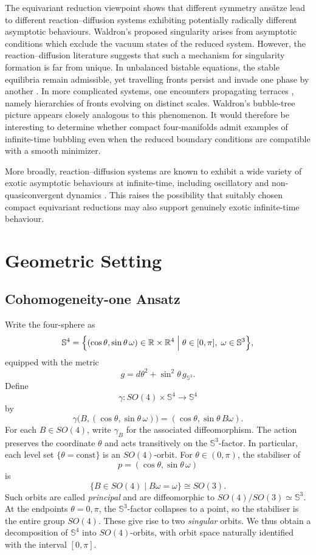 \documentclass[11pt,a4paper]{article}
\numberwithin{equation}{section}
\theoremstyle{plain}
\theoremstyle{remark}
\begin{document}
The equivariant reduction viewpoint shows that different symmetry ans\"{a}tze lead to different reaction–diffusion systems exhibiting potentially radically different asymptotic behaviours. Waldron’s proposed singularity arises from asymptotic conditions which exclude the vacuum states of the reduced system. However, the reaction–diffusion literature suggests that such a mechanism for singularity formation is far from unique. In unbalanced bistable equations, the stable equilibria remain admissible, yet travelling fronts persist and invade one phase by another \cite{Fukao2004}. In more complicated systems, one encounters propagating terraces \cite{alma992983579365301631}, namely hierarchies of fronts evolving on distinct scales. Waldron’s bubble-tree picture appears closely analogous to this phenomenon. It would therefore be interesting to determine whether compact four-manifolds admit examples of infinite-time bubbling even when the reduced boundary conditions are compatible with a smooth minimizer.

More broadly, reaction–diffusion systems are known to exhibit a wide variety of exotic asymptotic behaviours at infinite-time, including oscillatory and non-quasiconvergent dynamics \cite{inbook}. This raises the possibility that suitably chosen compact equivariant reductions may also support genuinely exotic infinite-time behaviour.


\section{Geometric Setting}
\subsection{Cohomogeneity-one Ansatz}
Write the four-sphere as
$$
\mathbb{S}^4
=
\Bigl\{
(\cos\theta,\sin\theta\,\omega)
\in \mathbb{R}\times\mathbb{R}^4
\;\Big|\;
\theta\in[0,\pi],\;
\omega\in \mathbb{S}^3
\Bigr\},
$$
equipped with the metric
$$
g=d\theta^2+\sin^2\theta\,g_{\mathbb S^3}.
$$
Define
$$
\gamma:SO(4)\times\mathbb S^4\longrightarrow\mathbb S^4
$$
by
$$
\gamma\bigl(B,(\cos\theta,\sin\theta\,\omega)\bigr)
=
(\cos\theta,\sin\theta\,B\omega).
$$
For each $B\in SO(4)$, write $\gamma_B$ for the associated
diffeomorphism. The action preserves the coordinate $\theta$ and acts
transitively on the $\mathbb S^3$-factor. In particular, each level set
$\{\theta=\mathrm{const}\}$ is an $SO(4)$-orbit. For
$\theta\in(0,\pi)$, the stabiliser of
$$
p=(\cos\theta,\sin\theta\,\omega)
$$
is
$$
\{B\in SO(4)\mid B\omega=\omega\}\cong SO(3).
$$
Such orbits are called \emph{principal} and are diffeomorphic to
$SO(4)/SO(3)\simeq\mathbb S^3$. At the endpoints
$\theta=0,\pi$, the $\mathbb S^3$-factor collapses to a point, so the
stabiliser is the entire group $SO(4)$. These give rise to two
\emph{singular} orbits. We thus obtain a decomposition of
$\mathbb S^4$ into $SO(4)$-orbits, with orbit space naturally
identified with the interval $[0,\pi]$.
\end{document}

